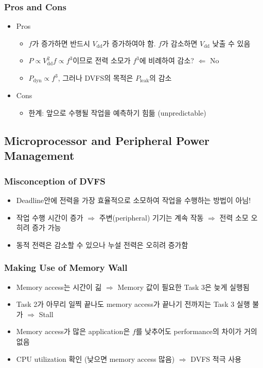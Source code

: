 \subsubsection*{Pros and Cons}
\begin{itemize}
    \item Pros
    \begin{itemize}
        \item $f$가 증가하면 반드시 $V_\mathrm{dd}$가 증가하여야 함. $f$가 감소하면 $V_\mathrm{dd}$ 낮출 수 있음
        \item $P \varpropto V_\mathrm{dd}^2 f \varpropto f^3$이므로 전력 소모가 $f^3$에 비례하여 감소? $\Leftarrow$ No
        \item $P_{\mathrm{dyn}} \varpropto f^3$, 그러나 DVFS의 목적은 $P_{\mathrm{leak}}$의 감소
    \end{itemize}
    \item Cons
    \begin{itemize}
        \item 한계: 앞으로 수행될 작업을 예측하기 힘듦 (unpredictable)
    \end{itemize}
\end{itemize}

\subsection{Microprocessor and Peripheral Power Management}

\subsubsection*{Misconception of DVFS}
\begin{itemize}
    \item Deadline안에 전력을 가장 효율적으로 소모하여 작업을 수행하는 방법이 아님!
    \item 작업 수행 시간이 증가 $\Rightarrow$ 주변(peripheral) 기기는 계속 작동 $\Rightarrow$ 전력 소모 오히려 증가 가능
    \item 동적 전력은 감소할 수 있으나 누설 전력은 오히려 증가함
\end{itemize}

\subsubsection*{Making Use of Memory Wall}
\begin{itemize}
    \item Memory access는 시간이 긺 $\Rightarrow$ Memory 값이 필요한 Task 3은 늦게 실행됨
    \item Task 2가 아무리 일찍 끝나도 memory access가 끝나기 전까지는 Task 3 실행 불가 $\Rightarrow$ Stall
    \item Memory access가 많은 application은 $f$를 낮추어도 performance의 차이가 거의 없음
    \item CPU utilization 확인 (낮으면 memory access 많음) $\Rightarrow$ DVFS 적극 사용
\end{itemize}

